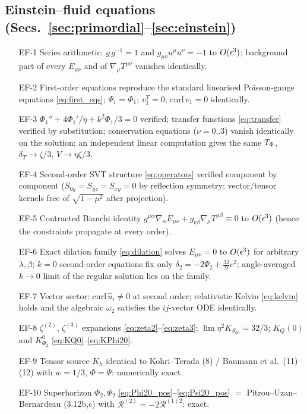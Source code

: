 \subsection*{Einstein--fluid equations (Secs.~\ref{sec:primordial}--\ref{sec:einstein})}
\begin{itemize}\itemsep1pt
\item[EF-1] Series arithmetic: $g\,g^{-1}=1$ and $g_{\mu\nu}u^\mu u^\nu=-1$ to $O(\epsilon^3)$; background part of every $E_{\mu\nu}$ and of $\nabla_\mu T^{\mu\nu}$ vanishes identically.
\item[EF-2] First-order equations reproduce the standard linearised Poisson-gauge equations \eqref{eq:first_eqs}; $\Psi_1=\Phi_1$; $v^T_1=0$; $\mathrm{curl}\,v_1=0$ identically.
\item[EF-3] $\Phi_1''+4\Phi_1'/\eta+k^2\Phi_1/3=0$ verified; transfer functions \eqref{eq:transfer} verified by substitution; conservation equations ($\nu=0..3$) vanish identically on the solution; an independent linear computation gives the same $T_\Phi$, $\delta_T\to\zeta/3$, $V\to\eta\zeta/3$.
\item[EF-4] Second-order SVT structure \eqref{eq:operators} verified component by component ($S_{0y}=S_{yz}=S_{xy}=0$ by reflection symmetry; vector/tensor kernels free of $\sqrt{1-\mu^2}$ after projection).
\item[EF-5] Contracted Bianchi identity $g^{\mu\alpha}\nabla_\alpha E_{\mu\nu}+g_{\nu\beta}\nabla_\mu T^{\mu\beta}\equiv0$ to $O(\epsilon^3)$ (hence the constraints propagate at every order).
\item[EF-6] Exact dilation family \eqref{eq:dilation} solves $E_{\mu\nu}=0$ to $O(\epsilon^3)$ for arbitrary $\lambda,\beta$; $k=0$ second-order equations fix only $\delta_2=-2\Psi_2+\tfrac{32}9c^2$; angle-averaged $k\to0$ limit of the regular solution lies on the family.
\item[EF-7] Vector sector: $\mathrm{curl}\,\hat u_i\neq0$ at second order; relativistic Kelvin \eqref{eq:kelvin} holds and the algebraic $\omega_2$ satisfies the $ij$-vector ODE identically.
\item[EF-8] $\zeta^{(2)}$, $\zeta^{(3)}$ expansions \eqref{eq:zeta2}--\eqref{eq:zeta3}; $\lim\eta^2K_{S_{00}}=32/3$; $K_Q(0)$ and $K^0_{\Phi_2}$ \eqref{eq:KQ0}--\eqref{eq:KPhi20}.
\item[EF-9] Tensor source $K_h$ identical to Kohri--Terada (8) / Baumann et al.\ (11)--(12) with $w=1/3$, $\Phi=\Psi$: numerically exact.
\item[EF-10] Superhorizon $\Phi_2,\Psi_2$ \eqref{eq:Phi20_pos}--\eqref{eq:Psi20_pos} $=$ Pitrou--Uzan--Bernardeau (3.12b,c) with $\mathcal R^{(2)}=-2\mathcal R^{(1)2}$: exact.

\end{itemize}
